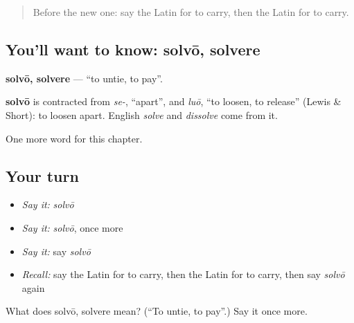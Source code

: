 \label{lesson:LA-C156-solvo}



\begin{quote}
Before the new one: say the Latin for to carry, then the Latin for to carry.
\end{quote}

\subsection*{You'll want to know: solvō, solvere}
\textbf{solvō, solvere} — \textquotedblleft{}to untie, to pay\textquotedblright{}.

\begin{cousinweb}
\textbf{solvō} is contracted from \emph{se-}, \textquotedblleft{}apart\textquotedblright{}, and \emph{luō}, \textquotedblleft{}to loosen, to release\textquotedblright{} (Lewis \& Short): to loosen apart. English \emph{solve} and \emph{dissolve} come from it.
\end{cousinweb}

\begin{grammarlens}[title={What you've built}]
One more word for this chapter.
\end{grammarlens}

\subsection*{Your turn}
\begin{itemize}
\raggedright
  \item \emph{Say it:} \emph{solvō}
  \item \emph{Say it:} \emph{solvō}, once more
  \item \emph{Say it:} say \emph{solvō}
  \item \emph{Recall:} say the Latin for to carry, then the Latin for to carry, then say \emph{solvō} again
\end{itemize}

\begin{tcolorbox}[breakable,colback=teal!4,colframe=teal!35!black,title={Before you move on}]
What does solvō, solvere mean? (\textquotedblleft{}To untie, to pay\textquotedblright{}.) Say it once more.
\end{tcolorbox}
